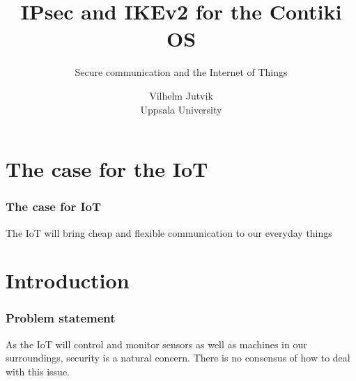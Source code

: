 \documentclass[pdf]{beamer}
\begin{document}
\title[IPsec and IKEv2 for the Contiki OS]{IPsec and IKEv2 for the Contiki OS\\}
\subtitle{Secure communication and the Internet of Things}
\author[Vilhelm Jutvik]{Vilhelm Jutvik\\Uppsala University\\}



\subject{IPsec and IKEv2 for the Contiki OS}

 \frame{
  \titlepage
 }


\section{The case for the IoT}
\begin{frame}
   \frametitle{The case for IoT}
   The IoT will bring cheap and flexible communication to our everyday things
\end{frame}


\section{Introduction}
\begin{frame}
   \frametitle{Problem statement}
   As the IoT will control and monitor sensors as well as machines in our surroundings, security is a natural concern. There is no consensus of how to deal with this issue.
\end{frame}
\end{document}
